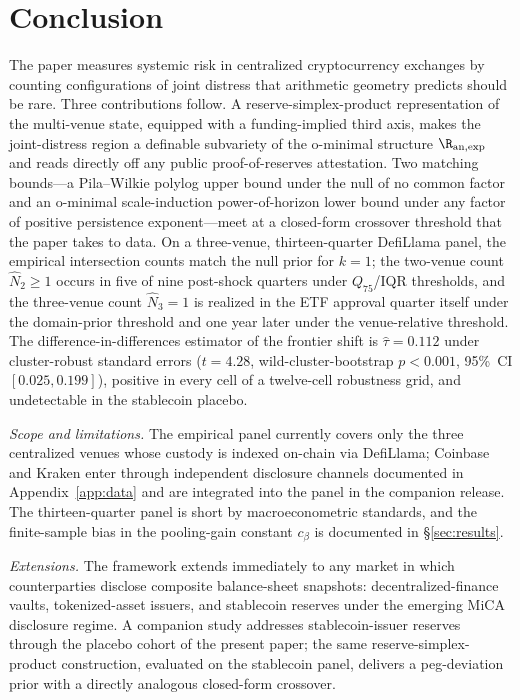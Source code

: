 \section{Conclusion}\label{sec:conclusion}

The paper measures systemic risk in centralized cryptocurrency
exchanges by counting configurations of joint distress that
arithmetic geometry predicts should be rare. Three contributions
follow. A reserve-simplex-product representation of the multi-venue
state, equipped with a funding-implied third axis, makes the
joint-distress region a definable subvariety of the o-minimal
structure $\R_{\mathrm{an},\exp}$ and reads directly off any public
proof-of-reserves attestation. Two matching bounds---a Pila--Wilkie
polylog upper bound under the null of no common factor and an
o-minimal scale-induction power-of-horizon lower bound under any
factor of positive persistence exponent---meet at a closed-form
crossover threshold that the paper takes to data. On a three-venue,
thirteen-quarter DefiLlama panel, the empirical intersection
counts match the null prior for $k = 1$; the two-venue count
$\hat N_2 \ge 1$ occurs in five of nine post-shock quarters under
$Q_{75}$/IQR thresholds, and the three-venue count $\hat N_3 = 1$
is realized in the ETF approval quarter itself under the
domain-prior threshold and one year later under the venue-relative
threshold. The difference-in-differences estimator of the frontier
shift is $\hat\tau = 0.112$ under cluster-robust standard errors
($t = 4.28$, wild-cluster-bootstrap $p < 0.001$, 95\%~CI
$[0.025, 0.199]$), positive in every cell of a twelve-cell
robustness grid, and undetectable in the stablecoin placebo.

\emph{Scope and limitations.} The empirical panel currently covers
only the three centralized venues whose custody is indexed
on-chain via DefiLlama; Coinbase and Kraken enter through
independent disclosure channels documented in
Appendix~\ref{app:data} and are integrated into the panel in the
companion release. The thirteen-quarter panel is short by
macroeconometric standards, and the finite-sample bias in the
pooling-gain constant $c_\beta$ is documented in
\S\ref{sec:results}.

\emph{Extensions.} The framework extends immediately to any market
in which counterparties disclose composite balance-sheet snapshots:
decentralized-finance vaults, tokenized-asset issuers, and
stablecoin reserves under the emerging MiCA disclosure regime. A
companion study addresses stablecoin-issuer reserves through the
placebo cohort of the present paper; the same
reserve-simplex-product construction, evaluated on the stablecoin
panel, delivers a peg-deviation prior with a directly analogous
closed-form crossover.

